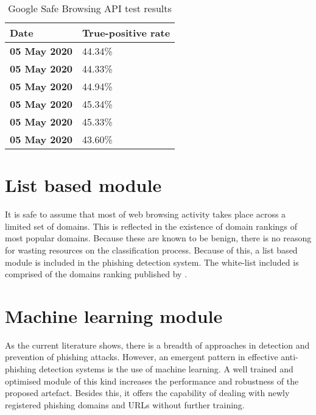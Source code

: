\begin{singlespace}
	\small
	\begin{table}
		\begin{center}
			\label{tab:GSBAPI_RESULTS}
			\begin{tabular}{ | m{8em} | m{13em} | }
				\hline
				\textbf{Date}        & \textbf{True-positive rate} \\
				\hline
				\textbf{05 May 2020} & 44.34\%                     \\
				\hline
				\textbf{05 May 2020} & 44.33\%                     \\
				\hline
				\textbf{05 May 2020} & 44.94\%                     \\
				\hline
				\textbf{05 May 2020} & 45.34\%                     \\
				\hline
				\textbf{05 May 2020} & 45.33\%                     \\
				\hline
				\textbf{05 May 2020} & 43.60\%                     \\
				\hline
			\end{tabular}
			\caption{Google Safe Browsing API test results}
		\end{center}
	\end{table}
\end{singlespace}


\section{List based module}
It is safe to assume that most of web browsing activity takes place across a limited set of domains. This is reflected in the existence of domain rankings of most popular domains. Because these are known to be benign, there is no reasong for wasting resources on the classification process. Because of this, a list based module is included in the phishing detection system.
The white-list included is comprised of the domains ranking published by \cite{MAJESTIC_MILLION}.

\section{Machine learning module}
As the current literature shows, there is a breadth of approaches in detection and prevention of phishing attacks. However, an emergent pattern in effective anti-phishing detection systems is the use of machine learning. A well trained and optimised module of this kind increases the performance and robustness of the proposed artefact. Besides this, it offers the capability of dealing with newly registered phishing domains and URLs without further training.

